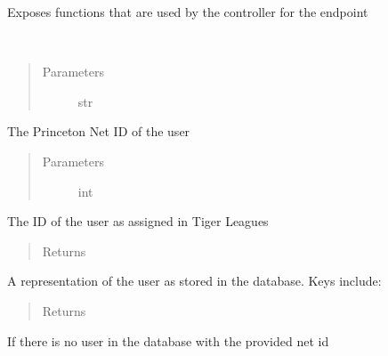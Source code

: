 \documentclass[letterpaper,10pt,english]{sphinxmanual}
\begin{document}
Exposes functions that are used by the controller for the  endpoint

\begin{fulllineitems}
\label{\detokenize{tiger_leagues/models/readme:tiger_leagues.models.user_model.get_user}}~\begin{quote}\begin{description}
\item[{Parameters}] \leavevmode
{} \textendash{} str

\end{description}\end{quote}

The Princeton Net ID of the user
\begin{quote}\begin{description}
\item[{Parameters}] \leavevmode
{} \textendash{} int

\end{description}\end{quote}

The ID of the user as assigned in Tiger Leagues
\begin{quote}\begin{description}
\item[{Returns}] \leavevmode
{}

\end{description}\end{quote}

A representation of the user as stored in the database. Keys include: 
\begin{quote}\begin{description}
\item[{Returns}] \leavevmode
{}

\end{description}\end{quote}

If there is no user in the database with the provided net id

\end{fulllineitems}
\end{document}
